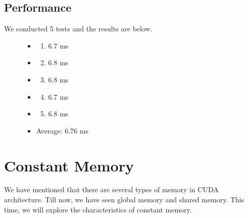 \documentclass[letterpaper,10pt,openany,oneside]{sphinxmanual}
\begin{document}
\subsection{Performance}
\label{RTACM/RTACM:performance}\begin{description}
\item[{We conducted 5 tests and the results are below.}] \leavevmode\begin{itemize}
\item {} \begin{enumerate}
\item {} 
6.7 ms

\end{enumerate}

\item {} \begin{enumerate}
\setcounter{enumi}{1}
\item {} 
6.8 ms

\end{enumerate}

\item {} \begin{enumerate}
\setcounter{enumi}{2}
\item {} 
6.8 ms

\end{enumerate}

\item {} \begin{enumerate}
\setcounter{enumi}{3}
\item {} 
6.7 ms

\end{enumerate}

\item {} \begin{enumerate}
\setcounter{enumi}{4}
\item {} 
6.8 ms

\end{enumerate}

\item {} 
Average: 6.76 ms

\end{itemize}

\end{description}


\section{Constant Memory}
\label{RTACM/RTACM:constant-memory}
We have mentioned that there are several types of memory in CUDA architecture. Till now, we have seen global memory and shared memory. This time, we will explore the characteristics of constant memory.
\end{document}
